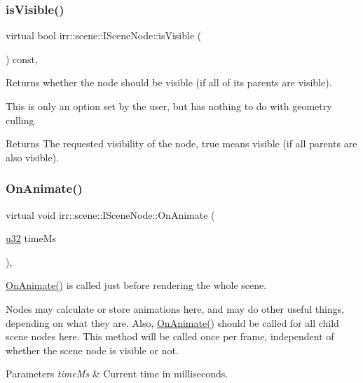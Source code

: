 \subsubsection{\texorpdfstring{is\+Visible()}{isVisible()}\hspace{0.1cm}{\footnotesize\ttfamily [2/2]}}
{\footnotesize\ttfamily virtual bool irr\+::scene\+::\+I\+Scene\+Node\+::is\+Visible (\begin{DoxyParamCaption}{ }\end{DoxyParamCaption}) const\hspace{0.3cm}{\ttfamily [inline]}, {\ttfamily [virtual]}}



Returns whether the node should be visible (if all of its parents are visible). 

This is only an option set by the user, but has nothing to do with geometry culling \begin{DoxyReturn}{Returns}
The requested visibility of the node, true means visible (if all parents are also visible). 
\end{DoxyReturn}
\mbox{\label{classirr_1_1scene_1_1ISceneNode_afc1dcb5cb19116d0c7aa3d4ebdf04cc5}} 
\subsubsection{\texorpdfstring{On\+Animate()}{OnAnimate()}\hspace{0.1cm}{\footnotesize\ttfamily [1/2]}}
{\footnotesize\ttfamily virtual void irr\+::scene\+::\+I\+Scene\+Node\+::\+On\+Animate (\begin{DoxyParamCaption}\item[{\hyperlink{namespaceirr_a0416a53257075833e7002efd0a18e804}{u32}}]{time\+Ms }\end{DoxyParamCaption})\hspace{0.3cm}{\ttfamily [inline]}, {\ttfamily [virtual]}}



\hyperlink{classirr_1_1scene_1_1ISceneNode_afc1dcb5cb19116d0c7aa3d4ebdf04cc5}{On\+Animate()} is called just before rendering the whole scene. 

Nodes may calculate or store animations here, and may do other useful things, depending on what they are. Also, \hyperlink{classirr_1_1scene_1_1ISceneNode_afc1dcb5cb19116d0c7aa3d4ebdf04cc5}{On\+Animate()} should be called for all child scene nodes here. This method will be called once per frame, independent of whether the scene node is visible or not. 
\begin{DoxyParams}{Parameters}
{\em time\+Ms} & Current time in milliseconds. \\
\hline
\end{DoxyParams}


